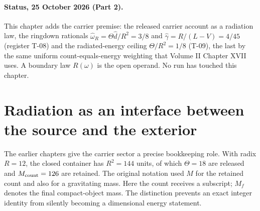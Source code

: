 \begin{abstract}
The carrier partition supplies three compact proposals: a radiated-energy ceiling of one eighth of an initial source budget, a fundamental frequency coefficient $3/8$, and a damping coefficient $4/45$. Their arithmetic is exact, but their interpretation as gravitational radiation requires a source-energy map, a physical unit chart and a causal field boundary condition. This chapter proves the ceiling under explicit reservoir premises, derives an illustrative outgoing-flux identity, and formulates the quasinormal-mode problem with a frequency-dependent surface response. It distinguishes the rational matches from the Schwarzschild spectrum, includes the weak-field binary-radiation obligation, and explains why spin, excitation and mass inference matter for observation. A worked finite pulse and independent arithmetic checks clarify which results are newly established analytically and which remain source-record reports. The same boundary law must ultimately account for the thermal behavior of Chapter VIII and the perturbative response studied here.
\end{abstract}

\paragraph*{Status, 25 October 2026 (Part 2).} This chapter adds the carrier premise: the released carrier account as a radiation law, the ringdown rationals $\hat\omega_R=\Theta\hat d/R^2=3/8$ and $\hat\gamma=R/(L-V)=4/45$ (register T-08) and the radiated-energy ceiling $\Theta/R^2=1/8$ (T-09), the last by the same uniform count-equals-energy weighting that Volume II Chapter XVII uses. A boundary law $R(\omega)$ is the open operand. No run has touched this chapter.


\section{Radiation as an interface between the source and the exterior}
The earlier chapters give the carrier sector a precise bookkeeping role. With radix $R=12$, the closed container has $R^2=144$ units, of which $\Theta=18$ are released and $M_{\rm count}=126$ are retained. The original notation used $M$ for the retained count and also for a gravitating mass. Here the count receives a subscript; $M_f$ denotes the final compact-object mass. The distinction prevents an exact integer identity from silently becoming a dimensional energy statement.

